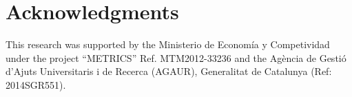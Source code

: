 \documentclass[12pt, a4paper]{article}
\newtheorem{prop}{Proposition}
\begin{document}
\section*{Acknowledgments}
This research was supported by the Ministerio de Econom\'ia y Competividad under the project
``METRICS'' Ref. MTM2012-33236 and the Agència de Gestió d'Ajuts Universitaris i de Recerca (AGAUR), Generalitat de Catalunya (Ref: 2014SGR551).



{}


% 
\end{document}
